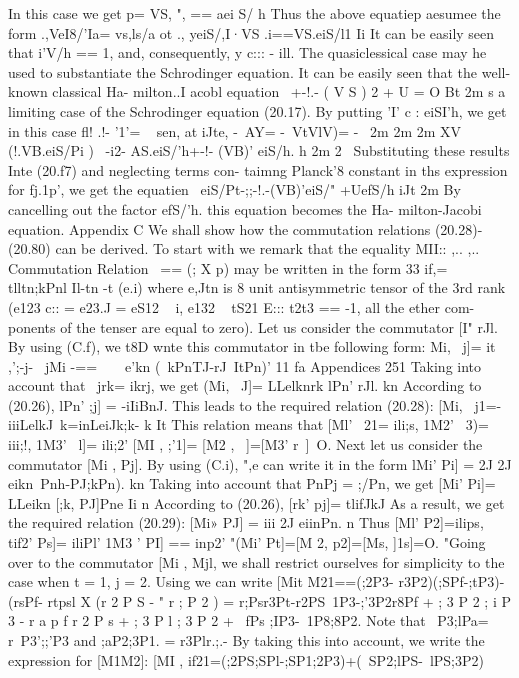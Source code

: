 \documentclass[a4paper,sfsidenotes,colorlinks=true]{tufte-book}
\numberwithin{equation}{section}
\numberwithin{figure}{section}
\begin{document}
{{{{{{In this case we get p= VS, ", == aei S/ h Thus the above equatiep aesumee the form .,VeI8/'Ia= vs,ls/a
ot
.,
yeiS/,I·VS .i==VS.eiS/l1 Ii
It can be easily seen that i'V/h == 1, and, consequently, y c::: -	ill. The quasiclessical case may he used to substantiate the Schrodinger equation. It can be easily seen that the well-known classical Ha- milton..I acobl	equation
~+-!.- ( V S ) 2 + U = O Bt	2m
s a limiting case of the Schrodinger equation (20.17). By putting 'I' c : eiSI'h, we get in this case
fl! .!- '1'=  ~	sen, at iJte,
-~AY= -~VtVlV)= -~ 2m 2m 2m
XV (!.VB.eiS/Pi ) ~-i2- AS.eiS/'h+-!- (VB)' eiS/h. h 2m 2~
Substituting these results Inte (20.f7) and neglecting terms con- taimng Planck'8 constant in ths expression for fj.1p', we get the
equatien
~eiS/Pt-;;-!.-(VB)'eiS/" +UefS/h iJt	2m
By cancelling out the factor efS/'h. this equation becomes the Ha- milton-Jacobi equation.
Appendix C We shall show how the commutation relations (20.28)-(20.80) can
be derived. To start with we remark that the equality MII:: ,..	,..
Commutation Relation~
== (; X p) may be written in the form 33
if,= ~ ~ tlltn;kPnl Il-tn -t
(e.i)
where e,Jtn is 8 unit antisymmetric tensor of the 3rd rank (e123 c:: = e23.J = eS12 ~ i, e132 ~ tS21 E::: t2t3 == -1, all the ether com- ponents of the tenser are equal to zero).
Let us consider the commutator [I" rJl. By using (C.f), we t8D wnte this commutator in tbe following form:
Mi,	~j]= it ,';-j- ~jMi -== ~ ~ e'kn (~kPnTJ-rJ~ItPn)' 11	fa
Appendices
251
Taking into account that ~jrk= ikrj, we get (Mi, ~J]= LLelknrk lPn' rJl.
kn According to (20.26), lPn' ;j] = -iIiBnJ. This leads to the required
relation (20.28): [Mi, ~j1=-iiiLelkJ~k=inLeiJk;k-
k It This relation means that
[Ml' ~21= ili;s,
1M2' ~3)= iii;!,
1M3' ~l]= ili;2'
[MI ,	;'1]= [M2 ,	~]=[M3' r~]~O.
Next let us consider the commutator [Mi , Pj]. By using (C.i), ",e can write it in the form
lMi' Pi] = 2J 2J eikn~Pnh-PJ;kPn). kn
Taking into account that PnPj = ;/Pn, we get [Mi' Pi]= LLeikn [;k, PJ]Pne
Ii n According to (20.26), [rk' pj]= tlifJkJ As a result, we get the
required relation (20.29):
[Mi» PJ] = iii 2J eiinPn. n
Thus [Ml' P2]=ilips, tif2'	Ps]= iliPl' 1M3 '	PI] == inp2'
"(Mi'	Pt]=[M 2,	p2]=[Ms,	]1s]=O. "Going over to the commutator [Mi , Mjl, we shall restrict ourselves
for simplicity to the case when t = 1, j = 2. Using we can write
[Mit M21==(;2P3- r3P2)(;SPf-;tP3)-(rsPf- rtpsl X (r 2 P S - " r ; P 2 ) = r;Psr3Pt-r2PS~1P3-;'3P2r8Pf
+ ; 3 P 2 ; i P 3 - r a p f r 2 P s + ; 3 P l ; 3 P 2 + ~fPs ;IP3-~1P8;8P2. Note that ~P3;lPa= r~P3';;'P3 and ;aP2;3P1. = r3Plr.;.-
By taking this into account, we write the expression for [M1M2]: [MI , if21=(;2PS;SPl-;SP1;2P3)+(~SP2;lPS-~lPS;3P2)
}}}}}}
\end{document}
